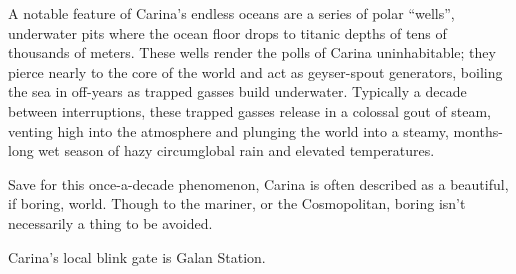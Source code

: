 A notable feature of Carina’s endless oceans are a series of polar “wells”, underwater pits where  
the ocean floor drops to titanic depths of tens of thousands of meters. These wells render the  
polls of Carina uninhabitable; they pierce nearly to the core of the world and act as geyser-spout  
generators, boiling the sea in off-years as trapped gasses build underwater. Typically a decade  
between interruptions, these trapped gasses release in a colossal gout of steam, venting high into  
the atmosphere and plunging the world into a steamy, months-long wet season of hazy  
circumglobal rain and elevated temperatures.  

Save for this once-a-decade phenomenon, Carina is often described as a beautiful, if boring,  
world. Though to the mariner, or the Cosmopolitan, boring isn’t necessarily a thing to be avoided.   

Carina’s local blink gate is Galan Station.    

                                                                                                            
